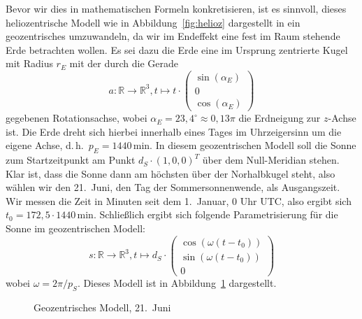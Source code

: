 \documentclass[
    paper=a4,
    DIV14,
    fontsize=12pt,
    pagesize=pdftex,
    toc=bibliographynumbered
]{scrartcl}
\numberwithin{figure}{section}
\numberwithin{equation}{section}
\numberwithin{table}{section}
\newcommand*\setR{\mathds{R}}
\newcommand*\vecd[3]{\begin{pmatrix} #1 \\ #2 \\ #3 \end{pmatrix}}
\begin{document}
Bevor wir dies in mathematischen Formeln konkretisieren, ist es sinnvoll, dieses
heliozentrische Modell wie in Abbildung~\ref{fig:helioz} dargestellt in ein geozentrisches
umzuwandeln, da wir im Endeffekt eine fest im Raum stehende Erde betrachten wollen. Es sei
dazu die Erde eine im Ursprung zentrierte Kugel mit Radius $r_E$ mit der durch die Gerade
\begin{equation*}
    a : \setR \to \setR^3, t \mapsto t\cdot \vecd{\sin(\alpha_E)}0{\cos(\alpha_E)}
\end{equation*}
gegebenen Rotationsachse, wobei $\alpha_E = 23{,}4^\circ \approx 0{,}13\pi$ die Erdneigung
zur $z$-Achse ist. Die Erde dreht sich hierbei innerhalb eines Tages im Uhrzeigersinn um
die eigene Achse, d.\,h.\ $p_E=1440\,\mathrm{min}$. In diesem geozentrischen Modell soll
die Sonne zum Startzeitpunkt am Punkt $d_S \cdot (1, 0, 0)^T$ über dem Null-Meridian
stehen. Klar ist, dass die Sonne dann am höchsten über der Norhalbkugel steht, also wählen
wir den 21.\ Juni, den Tag der Sommersonnenwende, als Ausgangszeit. Wir messen die Zeit in
Minuten seit dem 1.\ Januar, 0 Uhr UTC, also ergibt sich $t_0=172{,}5 \cdot 1440
\,\mathrm{min}$. Schließlich ergibt sich folgende Parametrisierung für die Sonne im
geozentrischen Modell:
\begin{equation*}
    s: \setR \to \setR^3, t\mapsto d_S \cdot
        \vecd{\cos( \omega(t - t_0) )}{\sin( \omega(t - t_0) )}0
\end{equation*}
wobei $\omega = 2\pi/p_S$. Dieses Modell ist in Abbildung~\ref{fig:geoz} dargestellt.

\begin{figure}[htb]
    \centering
    \caption{Geozentrisches Modell, 21.\ Juni}
    \label{fig:geoz}
\end{figure}
\end{document}
